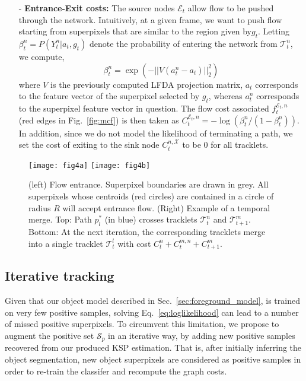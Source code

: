 \begin{itemize}
\item[-]{{\bf Entrance-Exit costs:}}
The source nodes $\mathcal{E}_t$ allow flow to be pushed through the network. Intuitively, at a given frame, we want to push flow starting from superpixels that are similar to the region given by$g_t$. Letting $\beta_t^n = P(Y_t^{n}|a_t,{g}_{t})$ denote the probability of entering the network from $\mathcal{T}_t^n$, we compute,
\begin{equation}
  \beta_{t}^n = \exp \left( -|| V(a_t^n - a_t)||^2_2 \right)
\label{eq:beta}
\end{equation}
where $V$ is the previously computed LFDA projection matrix, $a_t$ corresponds to the feature vector of the superpixel selected by $g_t$, whereas $a_t^n$ corresponds to the superpixel feature vector in question. The flow cost associated $f_{t}^{\mathcal{E}_t,n}$ (red edges in Fig.~\ref{fig:mcf}) is then taken as $C_{t}^{\mathcal{E}_t,n} = -\log(\beta_{t}^n / (1-\beta_{t}^n))$. In addition, since we do not model the likelihood of terminating a path, we set the cost of exiting to the sink node $C_{t}^{n,\mathcal{X}}$ to be 0 for all tracklets.
\end{itemize}

\begin{figure}[t]
\centering
\texttt{[image: fig4a]}
\texttt{[image: fig4b]}
\caption{(left) Flow entrance. Superpixel boundaries are drawn in grey. All superpixels whose centroids (red circles) are contained in a circle of radius $R$ will accept entrance flow. (Right) Example of a temporal merge. Top: Path $p_l^*$ (in blue) crosses tracklets $\mathcal{T}_t^n$ and $\mathcal{T}_{t+1}^{m}$. Bottom: At the next iteration, the corresponding tracklets merge into a single tracklet $\mathcal{T}_t^{l}$ with cost $C_t^n + C_{t}^{m,n} + C_{t+1}^{m}$.}
\label{fig:temporal_merge}
\end{figure}


\subsection{Iterative tracking}
\label{sec:iterative_ksp}
Given that our object model described in Sec.~\ref{sec:foreground_model}, is trained on very few positive samples, solving Eq.~\eqref{eq:loglikelihood} can lead to a number of missed positive superpixels. To circumvent this limitation, we propose to augment the positive set $\mathcal{S}_p$ in an iterative way, by adding new positive samples recovered from our produced KSP estimation. That is, after initially inferring the object segmentation, new object superpixels are considered as positive samples in order to re-train the classifer and recompute the graph costs. 

